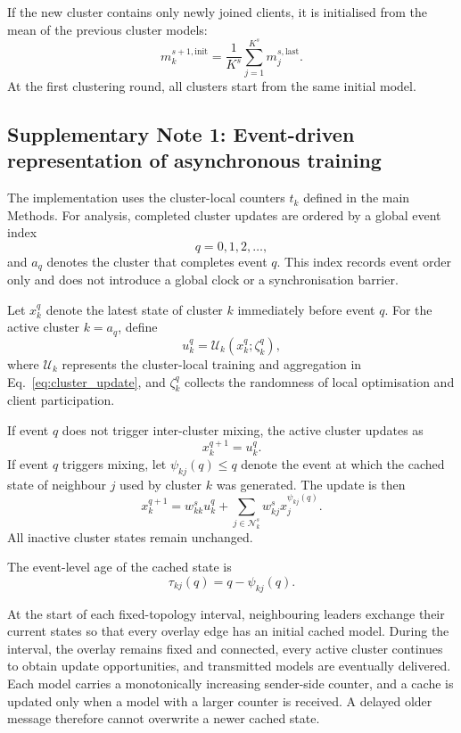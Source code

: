\documentclass[pdflatex,sn-mathphys-num]{sn-jnl}
\begin{document}
If the new cluster contains only newly joined clients, it is initialised from the mean of the previous cluster models:
\begin{equation}
m_k^{s+1,\mathrm{init}}
=
\frac{1}{K^s}
\sum_{j=1}^{K^s}
m_j^{s,\mathrm{last}} .
\label{eq:supp_new_cluster_initialisation}
\end{equation}
At the first clustering round, all clusters start from the same initial model.


\subsection{Supplementary Note 1: Event-driven representation of asynchronous training}
\label{supp:event_driven_representation}

The implementation uses the cluster-local counters \(t_k\) defined in the main Methods. For analysis, completed cluster updates are ordered by a global event index
\[
q
=
0,1,2,\ldots,
\]
and \(a_q\) denotes the cluster that completes event \(q\). This index records event order only and does not introduce a global clock or a synchronisation barrier.

Let \(x_k^q\) denote the latest state of cluster \(k\) immediately before event \(q\). For the active cluster \(k=a_q\), define
\[
u_k^q
=
\mathcal{U}_k
\left(
x_k^q;
\zeta_k^q
\right),
\]
where \(\mathcal{U}_k\) represents the cluster-local training and aggregation in Eq.~\eqref{eq:cluster_update}, and \(\zeta_k^q\) collects the randomness of local optimisation and client participation.

If event \(q\) does not trigger inter-cluster mixing, the active cluster updates as
\[
x_k^{q+1}
=
u_k^q.
\]
If event \(q\) triggers mixing, let \(\psi_{kj}(q)\leq q\) denote the event at which the cached state of neighbour \(j\) used by cluster \(k\) was generated. The update is then
\begin{equation}
x_k^{q+1}
=
w_{kk}^s
u_k^q
+
\sum_{j\in\mathcal{N}_k^s}
w_{kj}^s
x_j^{\psi_{kj}(q)} .
\label{eq:supp_asynchronous_event_update}
\end{equation}
All inactive cluster states remain unchanged.

The event-level age of the cached state is
\begin{equation}
\tau_{kj}(q)
=
q
-
\psi_{kj}(q).
\label{eq:supp_event_staleness}
\end{equation}

At the start of each fixed-topology interval, neighbouring leaders exchange their current states so that every overlay edge has an initial cached model. During the interval, the overlay remains fixed and connected, every active cluster continues to obtain update opportunities, and transmitted models are eventually delivered. Each model carries a monotonically increasing sender-side counter, and a cache is updated only when a model with a larger counter is received. A delayed older message therefore cannot overwrite a newer cached state.
\end{document}

